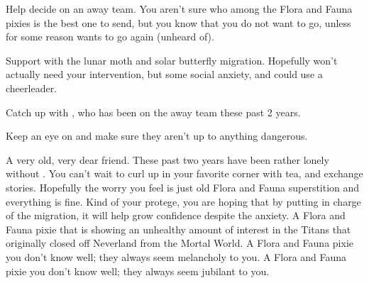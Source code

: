 \documentclass[char]{PP}
\begin{document}
\begin{itemz}
	\item Help \cSHead{} decide on an away team. You aren’t sure who among the Flora and Fauna pixies is the best one to send, but you know that you do not want to go, unless for some reason \cSPM{} wants to go again (unheard of).
	\item Support \cFButterfly{} with the lunar moth and solar butterfly migration. Hopefully \cFButterfly{\they} won’t actually need your intervention, but \cFButterfly{\they} \cFButterfly{\have} some social anxiety, and could use a cheerleader.
	\item Catch up with \cSPM{}, who has been on the away team these past 2 years.
	\item Keep an eye on \cFTitan{} and make sure they aren’t up to anything dangerous.
\end{itemz}

\begin{itemz}[Notes]
	\item 
\end{itemz}

\begin{contacts}
	\contact{\cSPM{}} A very old, very dear friend. These past two years have been rather lonely without \cSPM{\them}. You can’t wait to curl up in your favorite corner with tea, and exchange stories. Hopefully the worry you feel is just old Flora and Fauna superstition and everything is fine.
	\contact{\cFButterfly{}} Kind of your protege, you are hoping that by putting \cFButterfly{\them} in charge of the migration, it will help grow \cFButterfly{\their} confidence despite the anxiety.
	\contact{\cFTitan{}}  A Flora and Fauna pixie that is showing an unhealthy amount of interest in the Titans that originally closed off Neverland from the Mortal World.
	\contact{\cFWanabe{}} A Flora and Fauna pixie you don’t know well; they always seem melancholy to you.
	\contact{\cFHeart{}} A Flora and Fauna pixie you don’t know well; they always seem jubilant to you.
\end{contacts}
\end{document}
